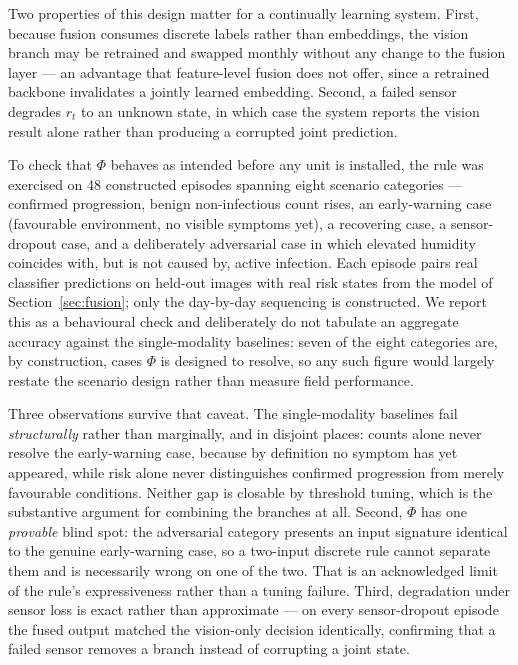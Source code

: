 \documentclass[journal]{IEEEtran}
\begin{document}
Two properties of this design matter for a continually learning system. First,
because fusion consumes discrete labels rather than embeddings, the vision branch may
be retrained and swapped monthly without any change to the fusion layer --- an
advantage that feature-level fusion does not offer, since a retrained backbone
invalidates a jointly learned embedding. Second, a failed sensor degrades $r_t$ to an
unknown state, in which case the system reports the vision result alone rather than
producing a corrupted joint prediction.

To check that $\Phi$ behaves as intended before any unit is installed, the rule was
exercised on 48 constructed episodes spanning eight scenario categories --- confirmed
progression, benign non-infectious count rises, an early-warning case (favourable
environment, no visible symptoms yet), a recovering case, a sensor-dropout case, and
a deliberately adversarial case in which elevated humidity coincides with, but is not
caused by, active infection. Each episode pairs real classifier predictions on
held-out images with real risk states from the model of
Section~\ref{sec:fusion}; only the day-by-day sequencing is constructed. We report
this as a behavioural check and deliberately do not tabulate an aggregate accuracy
against the single-modality baselines: seven of the eight categories are, by
construction, cases $\Phi$ is designed to resolve, so any such figure would largely
restate the scenario design rather than measure field performance.

Three observations survive that caveat. The single-modality baselines fail
\emph{structurally} rather than marginally, and in disjoint places: counts alone
never resolve the early-warning case, because by definition no symptom has yet
appeared, while risk alone never distinguishes confirmed progression from merely
favourable conditions. Neither gap is closable by threshold tuning, which is the
substantive argument for combining the branches at all. Second, $\Phi$ has one
\emph{provable} blind spot: the adversarial category presents an input signature
identical to the genuine early-warning case, so a two-input discrete rule cannot
separate them and is necessarily wrong on one of the two. That is an acknowledged
limit of the rule's expressiveness rather than a tuning failure. Third, degradation
under sensor loss is exact rather than approximate --- on every sensor-dropout
episode the fused output matched the vision-only decision identically, confirming
that a failed sensor removes a branch instead of corrupting a joint state.
\end{document}
